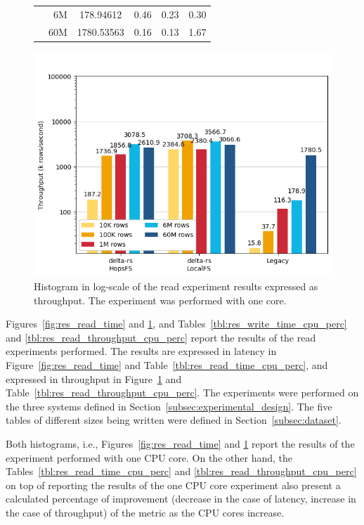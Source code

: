 \begin{figure}
\begin{minipage}[b]{\textwidth}
\begin{tabular}{c r S[table-format=4.5] S[table-format=2.2] S[table-format=2.2] S[table-format=2.2]}
            & 6M &   178.94612 & 0.46 & 0.23 & 0.30\\
            & 60M &  1780.53563 & 0.16 & 0.13 & 1.67\\
            \bottomrule
        \end{tabular}
    \end{minipage}
    \begin{minipage}[b]{\textwidth}
        \includegraphics[width=\textwidth]{figures/5-results/read/read_throughput_1_core.png}
        \caption[Histogram of the read experiment - Throughput - 1 CPU core]{Histogram in log-scale of the read experiment results expressed as throughput. The experiment was performed with one  core.}
        \label{fig:res_read_throughput}
    \end{minipage}
\end{figure}

Figures~\ref{fig:res_read_time} and \ref{fig:res_read_throughput}, and Tables~\ref{tbl:res_write_time_cpu_perc} and \ref{tbl:res_read_throughput_cpu_perc} report the results of the read experiments performed. The results are expressed in latency in Figure~\ref{fig:res_read_time} and Table~\ref{tbl:res_read_time_cpu_perc}, and expressed in throughput in Figure~\ref{fig:res_read_throughput} and Table~\ref{tbl:res_read_throughput_cpu_perc}. The experiments were performed on the three systems defined in Section~\ref{subsec:experimental_design}. The five tables of different sizes being written were defined in Section~\ref{subsec:dataset}.

Both histograms, i.e., Figures~\ref{fig:res_read_time} and \ref{fig:res_read_throughput} report the results of the experiment performed with one \gls{CPU} core. On the other hand, the Tables~\ref{tbl:res_read_time_cpu_perc} and \ref{tbl:res_read_throughput_cpu_perc} on top of reporting the results of the one \gls{CPU} core experiment also present a calculated percentage of improvement (decrease in the case of latency, increase in the case of throughput) of the metric as the \gls{CPU} cores increase.

